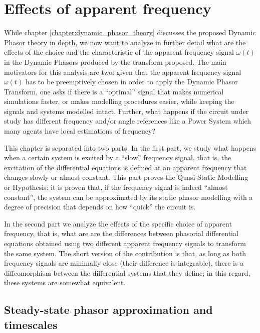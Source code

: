 \chapter{Effects of apparent frequency}\label{chapter:choice_apparent_frequency}

	While chapter \ref{chapter:dynamic_phasor_theory} discusses the proposed Dynamic Phasor theory in depth, we now want to analyze in further detail what are the effects of the choice and the characteristic of the apparent frequency signal $\omega(t)$ in the Dynamic Phasors produced by the transform proposed. The main motivators for this analysis are two: given that the apparent frequency signal $\omega(t)$ has to be preemptively chosen in order to apply the Dynamic Phasor Transform, one asks if there is a ``optimal'' signal that makes numerical simulations faster, or makes modelling procedures easier, while keeping the signals and systems modelled intact. Further, what happens if the circuit under study has different frequency and/or angle references like a Power System which many agents have local estimations of frequency?

	This chapter is separated into two parts. In the first part, we study what happens when a certain system is excited by a ``slow'' frequency signal, that is, the excitation of the differential equations is defined at an apparent frequency that changes slowly or almost constant. This part proves the Quasi-Static Modelling or Hypothesis: it is proven that, if the frequency signal is indeed ``almost constant'', the system can be approximated by its static phasor modelling with a degree of precision that depends on how ``quick'' the circuit is.

	In the second  part we analyze the effects of the specific choice of apparent frequency, that is, what are are the differences between phasorial differential equations obtained using two different apparent frequency signals to transform the same system. The short version of the contribution is that, as long as both frequency signals are minimally close (their difference is integrable), there is a diffeomorphism between the differential systems that they define; in this regard, these systems are somewhat equivalent.

\section{Steady-state phasor approximation and timescales}\label{chapter:algebraic_solvability_timescales} %

